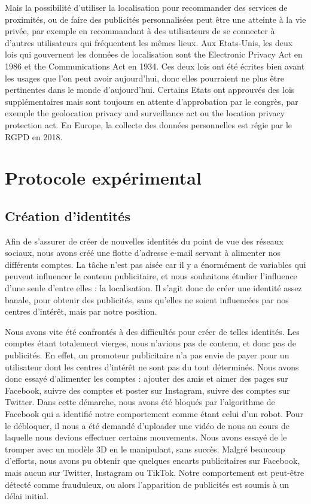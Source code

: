 \documentclass[runningheads]{llncs}
\begin{document}
Mais la possibilité d'utiliser la localisation pour recommander des services de proximités, ou de faire des publicités personnalisées peut être une atteinte à la vie privée, par exemple en recommandant à des utilisateurs de se connecter à d'autres utilisateurs qui fréquentent les mêmes lieux. Aux Etats-Unis, les deux lois qui gouvernent les données de localisation sont the Electronic Privacy Act en
1986 et the Communications Act en 1934. Ces deux lois ont été écrites bien avant les usages que l'on peut avoir aujourd'hui, donc elles pourraient ne plus être pertinentes dans le monde d'aujourd'hui. Certains Etats ont approuvés des lois supplémentaires mais sont toujours en attente d'approbation par le congrès, par exemple the geolocation privacy and surveillance act ou the location privacy protection act. En Europe, la collecte des données personnelles est régie par le RGPD en 2018.

\cite{karanja_unintended_2018}


\section{Protocole expérimental}

\subsection{Création d'identités}

Afin de s'assurer de créer de nouvelles identités du point de vue des réseaux sociaux, nous avons créé une flotte d'adresse e-mail servant à alimenter nos différents comptes. La tâche n'est pas aisée car il y a énormément de variables qui peuvent influencer le contenu publicitaire, et nous souhaitons étudier l'influence d'une seule d'entre elles : la localisation. Il s'agit donc de créer une identité assez banale, pour obtenir des publicités, sans qu'elles ne soient influencées par nos centres d'intérêt, mais par notre position.

Nous avons vite été confrontés à des difficultés pour créer de telles identités. Les comptes étant totalement vierges, nous n'avions pas de contenu, et donc pas de publicités. En effet, un promoteur publicitaire n'a pas envie de payer pour un utilisateur dont les centres d'intérêt ne sont pas du tout déterminés. Nous avons donc essayé d'alimenter les comptes : ajouter des amis et aimer des pages sur Facebook, suivre des comptes et poster sur Instagram, suivre des comptes sur Twitter. Dans cette démarche, nous avons été bloqués par l'algorithme de Facebook qui a identifié notre comportement comme étant celui d'un robot. Pour le débloquer, il nous a été demandé d'uploader une vidéo de nous au cours de laquelle nous devions effectuer certains mouvements. Nous avons essayé de le tromper avec un modèle 3D en le manipulant, sans succès. Malgré beaucoup d'efforts, nous avons pu obtenir que quelques encarts publicitaires sur Facebook, mais aucun sur Twitter, Instagram ou TikTok. Notre comportement est peut-être détecté comme frauduleux, ou alors l'apparition de publicités est soumis à un délai initial.
\end{document}
